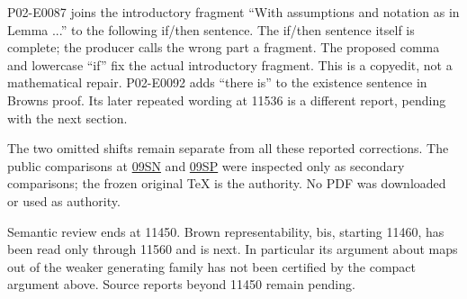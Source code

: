 P02-E0087 joins the introductory fragment ``With assumptions and notation as in Lemma ...'' to the following if/\allowbreak{}then sentence. The if/\allowbreak{}then sentence itself is complete; the producer calls the wrong part a fragment. The proposed comma and lowercase ``if'' fix the actual introductory fragment. This is a copyedit,\allowbreak{} not a mathematical repair. P02-E0092 adds ``there is'' to the existence sentence in Brown\textquotesingle s proof. Its later repeated wording at 11536 is a different report,\allowbreak{} pending with the next section.

The two omitted shifts remain separate from all these reported corrections. The public comparisons at \href{https://stacks.math.columbia.edu/tag/09SN}{09SN} and \href{https://stacks.math.columbia.edu/tag/09SP}{09SP} were inspected only as secondary comparisons; the frozen original TeX is the authority. No PDF was downloaded or used as authority.

Semantic review ends at 11450. Brown representability,\allowbreak{} bis,\allowbreak{} starting 11460,\allowbreak{} has been read only through 11560 and is next. In particular its argument about maps out of the weaker generating family has not been certified by the compact argument above. Source reports beyond 11450 remain pending.
